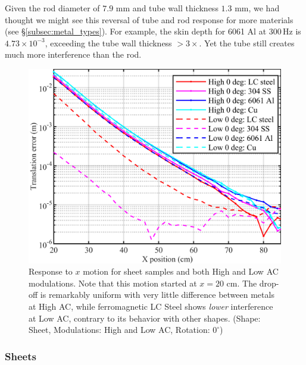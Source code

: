 \documentclass[journal,twoside,web]{ieeecolor}
\begin{document}
Given the rod diameter of $7.9$ mm and tube wall thickness $1.3$ mm, we had thought we might see this reversal of tube and rod response for more materials (see \S\ref{subsec:metal_types}). For example, the skin depth for 6061 Al at 300\,Hz is $4.73\times10^{-3}$, exceeding the tube wall thickness $>3\times$. Yet the tube still creates much more interference than the rod.

\begin{figure}[H]
\centerline{\includegraphics[width=\columnwidth]{chaic13.png}}
\caption{Response to $x$ motion for sheet samples and both High and Low AC modulations. Note that this motion started at $x = 20$ cm. The drop-off is remarkably uniform with very little difference between metals at High AC, while ferromagnetic LC Steel shows \textit{lower} interference at Low AC, contrary to its behavior with other shapes.
(Shape: Sheet, Modulations: High and Low AC, Rotation: $0^\circ$)}
\label{sheet_0deg}
\end{figure}

\subsubsection{Sheets}
\label{subsubsec:sheets_effect}
\end{document}

